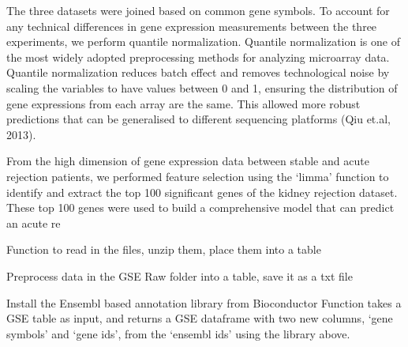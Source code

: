 \documentclass[a4paper,9pt,twocolumn,twoside,]{pinp}
\begin{document}
The three datasets were joined based on common gene symbols. To account
for any technical differences in gene expression measurements between
the three experiments, we perform quantile normalization. Quantile
normalization is one of the most widely adopted preprocessing methods
for analyzing microarray data. Quantile normalization reduces batch
effect and removes technological noise by scaling the variables to have
values between 0 and 1, ensuring the distribution of gene expressions
from each array are the same. This allowed more robust predictions that
can be generalised to different sequencing platforms (Qiu et.al, 2013).

From the high dimension of gene expression data between stable and acute
rejection patients, we performed feature selection using the `limma'
function to identify and extract the top 100 significant genes of the
kidney rejection dataset. These top 100 genes were used to build a
comprehensive model that can predict an acute re

Function to read in the files, unzip them, place them into a table

Preprocess data in the GSE Raw folder into a table, save it as a txt
file

\begin{Shaded}
\begin{Highlighting}[]
\NormalTok{ =}\StringTok{ }\NormalTok{(}\NormalTok{)}
\NormalTok{, }\NormalTok{)}
\end{Highlighting}
\end{Shaded}

Install the Ensembl based annotation library from Bioconductor Function
takes a GSE table as input, and returns a GSE dataframe with two new
columns, `gene symbols' and `gene ids', from the `ensembl ids' using the
library above.

\begin{Shaded}
\begin{Highlighting}[]
\NormalTok{(}\NormalTok{)}

\StringTok{ }
\StringTok{ }
         
         \NormalTok{(}\NormalTok{), }
         \NormalTok{)}
\StringTok{ }
\StringTok{ }
 \NormalTok{, }
         \NormalTok{, }
         \NormalTok{)}
\NormalTok{\}}
\end{Highlighting}
\end{Shaded}
\end{document}
